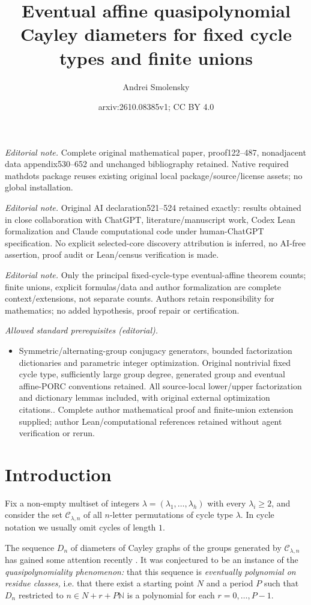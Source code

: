 \documentclass[DIV=12,10pt]{scrartcl}
\title{Eventual affine quasipolynomial Cayley diameters for fixed cycle types and finite unions}
\author{Andrei Smolensky}
\date{arxiv:2610.08385v1; CC BY 4.0}
\theoremstyle{definition}
\newcommand{\cc}{\mathcal{C}}
\begin{document}
\maketitle
\noindent\textit{Editorial note.} Complete original mathematical paper, proof122--487, nonadjacent data appendix530--652 and unchanged bibliography retained. Native required mathdots package reuses existing original local package/source/license assets; no global installation.\par\medskip
\noindent\textit{Editorial note.} Original AI declaration521--524 retained exactly: results obtained in close collaboration with ChatGPT, literature/manuscript work, Codex Lean formalization and Claude computational code under human-ChatGPT specification. No explicit selected-core discovery attribution is inferred, no AI-free assertion, proof audit or Lean/census verification is made.\par\medskip
\noindent\textit{Editorial note.} Only the principal fixed-cycle-type eventual-affine theorem counts; finite unions, explicit formulas/data and author formalization are complete context/extensions, not separate counts. Authors retain responsibility for mathematics; no added hypothesis, proof repair or certification.\par\medskip
\noindent\textit{Allowed standard prerequisites (editorial).}\begin{itemize}
\item Symmetric/alternating-group conjugacy generators, bounded factorization dictionaries and parametric integer optimization. Original nontrivial fixed cycle type, sufficiently large group degree, generated group and eventual affine-PORC conventions retained. All source-local lower/upper factorization and dictionary lemmas included, with original external optimization citations.. Complete author mathematical proof and finite-union extension supplied; author Lean/computational references retained without agent verification or rerun.
\end{itemize}\medskip
\section*{Introduction}

Fix a non-empty multiset of integers $\lambda = (\lambda_1,\ldots,\lambda_h)$ with every $\lambda_i\geqslant 2$, and consider the set $\cc_{\lambda,n}$ of all $n$-letter permutations of cycle type $\lambda$. In cycle notation we usually omit cycles of length $1$.

The sequence $D_n$ of diameters of Cayley graphs of the groups generated by $\cc_{\lambda,n}$ has gained some attention recently \cite{MO512777}. It was conjectured to be an instance of the \emph{quasipolynomiality phenomenon:} that this sequence is \emph{eventually polynomial on residue classes,} i.e. that there exist a starting point $N$ and a period $P$ such that $D_n$ restricted to $n\in N+r+P\mathbb{N}$ is a polynomial for each $r=0,\ldots,P-1$.
\end{document}
